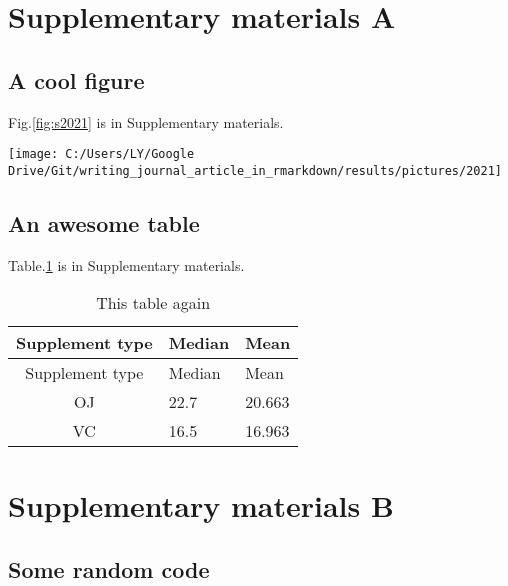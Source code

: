 \documentclass[review]{elsarticle} %
\let\origfigure\figure
\let\endorigfigure\endfigure
\renewenvironment{figure}[1][2] {
    \expandafter\origfigure\expandafter[H]
} {
    \endorigfigure
}
\begin{document}
\section{Supplementary materials A}\label{appendixA}

\subsection{A cool figure}\label{a-cool-figure}

Fig.\ref{fig:s2021} is in Supplementary materials.

\begin{figure}

{\centering \texttt{[image: C:/Users/LY/Google Drive/Git/writing\_journal\_article\_in\_rmarkdown/results/pictures/2021]} 

}

\caption{A plot in Supplementary Materials}\label{fig:s2021}
\end{figure}

\subsection{An awesome table}\label{an-awesome-table}

Table.\ref{tab:stable} is in Supplementary materials.

\begin{longtable}[]{@{}cll@{}}
\caption{\label{tab:unnamed-chunk-11}\label{tab:stable}This table
again}\tabularnewline
\toprule
Supplement type & Median & Mean\tabularnewline
\midrule
\endfirsthead
\toprule
Supplement type & Median & Mean\tabularnewline
\midrule
\endhead
OJ & 22.7 & 20.663\tabularnewline
VC & 16.5 & 16.963\tabularnewline
\bottomrule
\end{longtable}

\newpage

\renewcommand{\thefigure}{B.\arabic{figure}}

\setcounter{figure}{0} \renewcommand{\thetable}{B.\arabic{table}}
\setcounter{table}{0} \renewcommand{\theequation}{B.\arabic{equation}}
\setcounter{equation}{0}

\section{Supplementary materials B}\label{appendixB}

\subsection{Some random code}\label{some-random-code}
\end{document}
